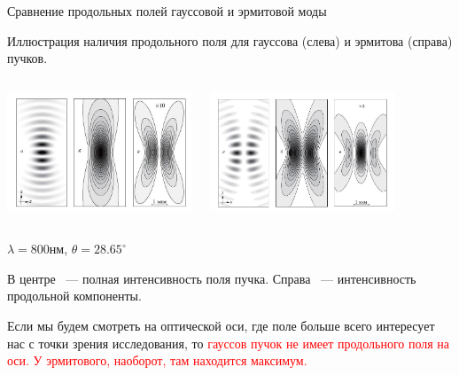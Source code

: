 \documentclass[9pt, compress, xcolor=table]{beamer}
\begin{document}
\begin{frame}{Сравнение продольных полей гауссовой и эрмитовой моды}

Иллюстрация наличия продольного поля для гауссова (слева) и эрмитова (справа) пучков.
\begin{columns}[c]
\column{6.5cm}
\begin{center}
\includegraphics[width=5.5cm]{fig3_02}
\end{center}
\column{6.5cm}
\begin{center}
\includegraphics[width=5.5cm]{fig3_03}
\end{center}
\end{columns}
$\lambda=800$нм, $\theta = 28.65^{\circ}$

В центре ~--- полная интенсивность поля пучка. Справа ~--- интенсивность продольной компоненты.

Если мы будем смотреть на оптической оси, где поле больше всего интересует нас с точки зрения исследования, то  \textcolor{red}{гауссов пучок не имеет продольного поля на оси. У эрмитового, наоборот, там находится максимум.}
\end{frame}
\end{document}
